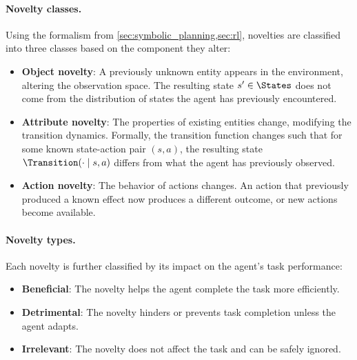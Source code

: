 \paragraph{Novelty classes.} Using the formalism from \cref{sec:symbolic_planning,sec:rl}, novelties are classified into three classes based on the component they alter:
\begin{itemize}[leftmargin=*]
    \item \textbf{Object novelty}: A previously unknown entity appears in the environment, altering the observation space. The resulting state $s' \in \States$ does not come from the distribution of states the agent has previously encountered.
    \item \textbf{Attribute novelty}: The properties of existing entities change, modifying the transition dynamics. Formally, the transition function changes such that for some known state-action pair $(s, a)$, the resulting state $\Transition(\cdot \mid s, a)$ differs from what the agent has previously observed.
    \item \textbf{Action novelty}: The behavior of actions changes. An action that previously produced a known effect now produces a different outcome, or new actions become available.
\end{itemize}

\paragraph{Novelty types.} Each novelty is further classified by its impact on the agent's task performance:
\begin{itemize}[leftmargin=*]
    \item \textbf{Beneficial}: The novelty helps the agent complete the task more efficiently.
    \item \textbf{Detrimental}: The novelty hinders or prevents task completion unless the agent adapts.
    \item \textbf{Irrelevant}: The novelty does not affect the task and can be safely ignored.
\end{itemize}

